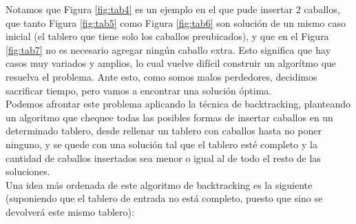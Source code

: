 

Notamos que Figura \ref{fig:tab4} es un ejemplo en el que pude insertar 2 caballos, que tanto Figura \ref{fig:tab5} como Figura \ref{fig:tab6} son solución de un mismo caso inicial (el tablero que tiene solo los caballos preubicados), y que en el Figura \ref{fig:tab7} no es necesario agregar ningún caballo extra. Esto significa que hay casos muy variados y amplios, lo cual vuelve difícil construir un algorítmo que resuelva el problema. Ante esto, como somos malos perdedores, decidimos sacrificar tiempo, pero vamos a encontrar una solución óptima.\\
Podemos afrontar este problema aplicando la técnica de backtracking, planteando un algoritmo que chequee todas las posibles formas de insertar caballos en un determinado tablero, desde rellenar un tablero con caballos hasta no poner ninguno, y se quede con una solución tal que el tablero esté completo y la cantidad de caballos insertados sea menor o igual al de todo el resto de las soluciones.\\
Una idea más ordenada de este algoritmo de backtracking es la siguiente (suponiendo que el tablero de entrada no está completo, puesto que sino se devolverá este mismo tablero):
